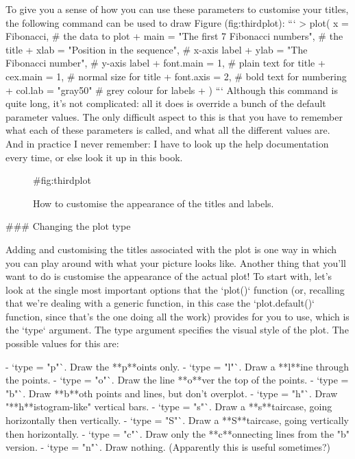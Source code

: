 To give you a sense of how you can use these parameters to customise your titles, the following command can be used to draw Figure \@ref(fig:thirdplot):
```
> plot( x = Fibonacci,                           # the data to plot
+       main = "The first 7 Fibonacci numbers",  # the title 
+       xlab = "Position in the sequence",       # x-axis label
+       ylab = "The Fibonacci number",           # y-axis label
+       font.main = 1,                           # plain text for title 
+       cex.main = 1,                            # normal size for title
+       font.axis = 2,                           # bold text for numbering
+       col.lab = "gray50"                       # grey colour for labels
+ )
```
Although this command is quite long, it's not complicated: all it does is override a bunch of the default parameter values. The only difficult aspect to this is that you have to remember what each of these parameters is called, and what all the different values are. And in practice I never remember: I have to look up the help documentation every time, or else look it up in this book.
\begin{figure}[t]
\begin{center}
\caption{How to customise the appearance of the titles and labels.}
\HR
{#fig:thirdplot}
\end{center}
\end{figure}


### Changing the plot type


Adding and customising the titles associated with the plot is one way in which you can play around with what your picture looks like. Another thing that you'll want to do is customise the appearance of the actual plot! To start with, let's look at the single most important options that the `plot()` function (or, recalling that we're dealing with a generic function, in this case the `plot.default()` function, since that's the one doing all the work) provides for you to use, which is the `type` argument. The type argument specifies the visual style of the plot. The possible values for this are:
 
- `type = "p"`. Draw the **p**oints only.
- `type = "l"`. Draw a **l**ine through the points.
- `type = "o"`. Draw the line **o**ver the top of the points.
- `type = "b"`. Draw **b**oth points and lines, but don't overplot.
- `type = "h"`. Draw "**h**istogram-like" vertical bars.
- `type = "s"`. Draw a **s**taircase, going horizontally then vertically.
- `type = "S"`. Draw a **S**taircase, going vertically then horizontally.
- `type = "c"`. Draw only the **c**onnecting lines from the "b" version.
- `type = "n"`. Draw nothing. (Apparently this is useful sometimes?)

